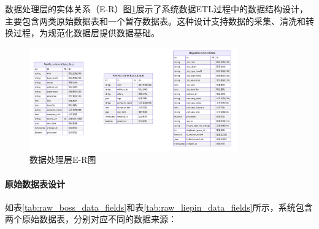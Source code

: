

数据处理层的实体关系（E-R）图\ref{fig:processing_er}展示了系统数据ETL过程中的数据结构设计，主要包含两类原始数据表和一个暂存数据表。这种设计支持数据的采集、清洗和转换过程，为规范化数据层提供数据基础。

\begin{figure}[htbp]
  \centering
  \includegraphics[width=0.8\textwidth]{figures/数据处理层ER图.png}
  \caption{数据处理层E-R图}
  \label{fig:processing_er}
\end{figure}

\paragraph{原始数据表设计}
如表\ref{tab:raw_boss_data_fields}和表\ref{tab:raw_liepin_data_fields}所示，系统包含两个原始数据表，分别对应不同的数据来源：

